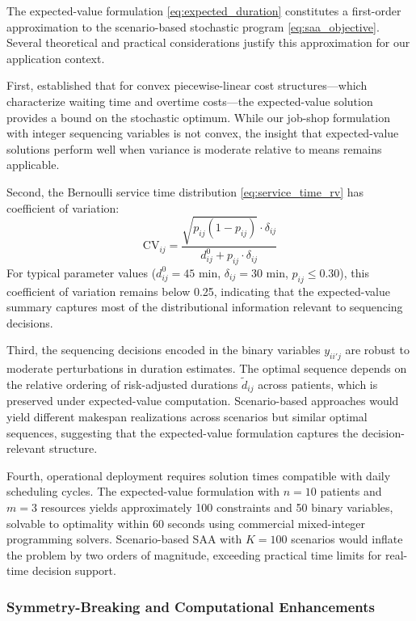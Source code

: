 The expected-value formulation \eqref{eq:expected_duration} constitutes a first-order approximation to the scenario-based stochastic program \eqref{eq:saa_objective}. Several theoretical and practical considerations justify this approximation for our application context.

First, \citet{denton2003sequential} established that for convex piecewise-linear cost structures---which characterize waiting time and overtime costs---the expected-value solution provides a bound on the stochastic optimum. While our job-shop formulation with integer sequencing variables is not convex, the insight that expected-value solutions perform well when variance is moderate relative to means remains applicable.

Second, the Bernoulli service time distribution \eqref{eq:service_time_rv} has coefficient of variation:
\begin{equation}
\text{CV}_{ij} = \frac{\sqrt{p_{ij}(1-p_{ij})} \cdot \delta_{ij}}{d_{ij}^0 + p_{ij} \cdot \delta_{ij}}
\end{equation}
For typical parameter values ($d_{ij}^0 = 45$ min, $\delta_{ij} = 30$ min, $p_{ij} \leq 0.30$), this coefficient of variation remains below 0.25, indicating that the expected-value summary captures most of the distributional information relevant to sequencing decisions.

Third, the sequencing decisions encoded in the binary variables $y_{ii'j}$ are robust to moderate perturbations in duration estimates. The optimal sequence depends on the relative ordering of risk-adjusted durations $\tilde{d}_{ij}$ across patients, which is preserved under expected-value computation. Scenario-based approaches would yield different makespan realizations across scenarios but similar optimal sequences, suggesting that the expected-value formulation captures the decision-relevant structure.

Fourth, operational deployment requires solution times compatible with daily scheduling cycles. The expected-value formulation with $n = 10$ patients and $m = 3$ resources yields approximately 100 constraints and 50 binary variables, solvable to optimality within 60 seconds using commercial mixed-integer programming solvers. Scenario-based SAA with $K = 100$ scenarios would inflate the problem by two orders of magnitude, exceeding practical time limits for real-time decision support.

\subsubsection{Symmetry-Breaking and Computational Enhancements}

